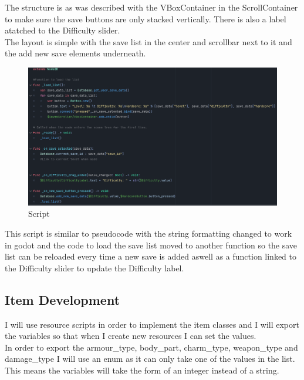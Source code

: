 \documentclass{article}
\begin{document}
        The structure is as was described with the VBoxContainer in the ScrollContainer to make sure the save buttons are only stacked vertically. There is also a label atatched to the Difficulty slider.\\
        The layout is simple with the save list in the center and scrollbar next to it and the add new save elements underneath.\\
        \begin{figure}[H]
                \centering
                \includegraphics[width = 0.8\columnwidth]{images/development/SaveMenu_script.PNG}
                \caption{Script}
        \end{figure}
        This script is similar to pseudocode with the string formatting changed to work in godot and the code to load the save list moved to another function so the save list can be reloaded every time a new save is added aswell as a function linked to the Difficulty slider to update the Difficulty label.\\
        \newpage
        \subsection{Item Development}
        I will use resource scripts in order to implement the item classes and I will export the variables so that when I create new resources I can set the values.\\
        In order to export the armour\_type, body\_part, charm\_type, weapon\_type and damage\_type I will use an enum as it can only take one of the values in the list. This means the variables will take the form of an integer instead of a string.\\
\end{document}
